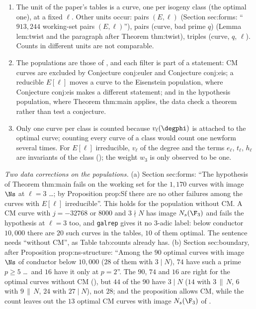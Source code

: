 \begin{sloppypar}
\begin{definition}\label{def:computation:units}
\begin{enumerate}[label=(\roman*)]
\item The unit of the paper's tables is a curve, one per isogeny class (the optimal one), at a fixed $\ell$. Other units occur: pairs $(E,\ell)$
(Section sec:forms: ``$913{,}244$ working-set pairs $(E,\ell)$''), pairs (curve, bad prime $q$) (Lemma lem:twist and the paragraph after Theorem thm:twist),
triples (curve, $q$, $\ell$). Counts in different units are not comparable.
\item The populations are those of , and each filter is part of a statement: CM curves are excluded by
Conjecture conj:euler and Conjecture conj:eis; a reducible $E[\ell]$ moves a curve to the Eisenstein population, where Conjecture conj:eis makes a
different statement; and in the hypothesis population, where Theorem thm:main applies, the data check a theorem rather than test a conjecture.
\item Only one curve per class is counted because $v_\ell(\degphi)$ is attached to the optimal curve; counting every curve of a class would count
one newform several times. For $E[\ell]$ irreducible, $v_\ell$ of the degree and the terms $e_\ell$, $t_\ell$, $h_\ell$ are invariants of the class
(); the weight $w_3$ is only observed to be one.
\end{enumerate}
\end{definition}

\emph{Two data corrections on the populations.} (a) Section sec:forms: ``The hypothesis of Theorem thm:main fails on the working set for the $1{,}170$
curves with image $\Ns$ at $\ell=3$ \dots; by Proposition prop:Sf there are no other failures among the curves with $E[\ell]$ irreducible''. This holds
for the population without CM. A CM curve with $j=-32768$ or $8000$ and $3\nmid N$ has image $N_s(\F_3)$ and fails the hypothesis at $\ell=3$ too, and
\texttt{galrep} gives it no $3$-adic label: below conductor $10{,}000$ there are $20$ such curves in the tables, $10$ of them optimal. The sentence needs
``without CM'', as Table tab:counts already has. (b) Section sec:boundary, after Proposition prop:ns-structure: ``Among the $90$ optimal curves with
image $\Ns$ of conductor below $10{,}000$ ($28$ of them with $3\mid N$), $74$ have such a prime $p\ge5$ \dots\ and $16$ have it only at $p=2$''. The $90$,
$74$ and $16$ are right for the optimal curves without CM (), but $44$ of the $90$ have $3\mid N$ ($14$ with $3\,\|\,N$, $6$
with $9\,\|\,N$, $24$ with $27\mid N$), not $28$; and the proposition allows CM, while the count leaves out the $13$ optimal CM curves with image
$N_s(\F_3)$ of .


\end{sloppypar}
